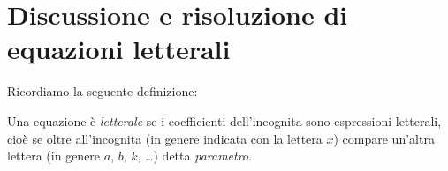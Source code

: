 \vspazio\ovalbox{\ref{ese:3.48}, \ref{ese:3.49}, \ref{ese:3.50}, \ref{ese:3.51},\ref{ese:3.52}, \ref{ese:3.53}, \ref{ese:3.54},\ref{ese:3.55}, \ref{ese:3.56}, \ref{ese:3.57}}

\section{Discussione e risoluzione di equazioni letterali}
Ricordiamo la seguente definizione:
\begin{definizione}
Una equazione è \emph{letterale} se i coefficienti dell'incognita sono espressioni letterali, cioè se oltre all'incognita (in genere indicata con
la lettera $x$) compare un'altra lettera (in genere $a$, $b$, $k$, \ldots) detta \emph{parametro}.
\end{definizione}

